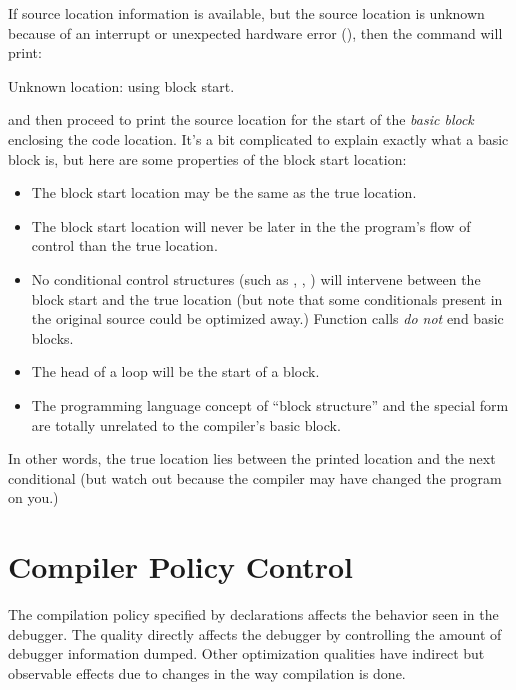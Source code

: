 If source location information is available, but the source location is
unknown because of an interrupt or unexpected hardware error
(), then the command will print:

\begin{example}
Unknown location: using block start.
\end{example}

and then proceed to print the source location for the start of the
{\em basic block} enclosing the code location.
  
It's a bit complicated to explain exactly what a basic block is, but
here are some properties of the block start location:

\begin{itemize}
  
\item The block start location may be the same as the true location.
  
\item The block start location will never be later in the the
  program's flow of control than the true location.
  
\item No conditional control structures (such as ,
  , ) will intervene between the block start and
  the true location (but note that some conditionals present in the
  original source could be optimized away.)  Function calls {\em do not}
  end basic blocks.
  
\item The head of a loop will be the start of a block.
  
\item The programming language concept of ``block structure'' and the
  \clisp{}  special form are totally unrelated to the
  compiler's basic block.
\end{itemize}

In other words, the true location lies between the printed location and the
next conditional (but watch out because the compiler may have changed the
program on you.)


\section{Compiler Policy Control}
\label{debugger-policy}

The compilation policy specified by  declarations affects the
behavior seen in the debugger.  The  quality directly affects the
debugger by controlling the amount of debugger information dumped.  Other
optimization qualities have indirect but observable effects due to changes in
the way compilation is done.

